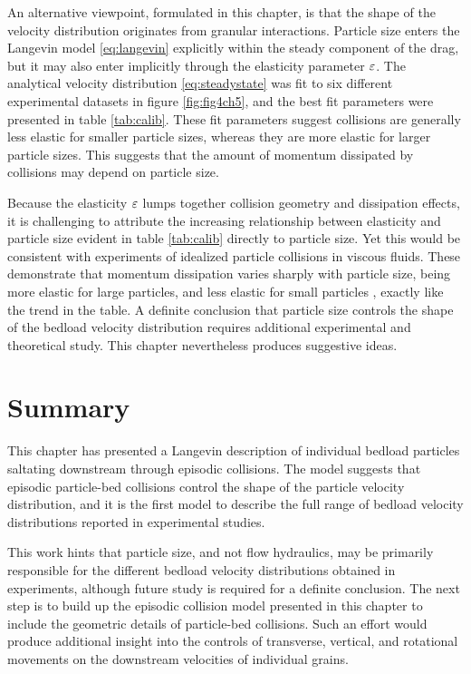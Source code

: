 An alternative viewpoint, formulated in this chapter, is that the shape of the velocity distribution originates from granular interactions.
Particle size enters the Langevin model \ref{eq:langevin} explicitly within the steady component of the drag, but it may also enter implicitly through the elasticity parameter $\varepsilon$.
The analytical velocity distribution \ref{eq:steadystate} was fit to six different experimental datasets in figure \ref{fig:fig4ch5}, and the best fit parameters were presented in table \ref{tab:calib}.
These fit parameters suggest collisions are generally less elastic for smaller particle sizes, whereas they are more elastic for larger particle sizes. This suggests that the amount of momentum dissipated by collisions may depend on particle size.

Because the elasticity $\varepsilon$ lumps together collision geometry and dissipation effects, it is challenging to attribute the increasing relationship between elasticity and particle size evident in table \ref{tab:calib} directly to particle size.
Yet this would be consistent with experiments of idealized particle collisions in viscous fluids. These demonstrate that momentum dissipation varies sharply with particle size, being more elastic for large particles, and less elastic for small particles \citep{Joseph2001,Yang2006,Schmeeckle2001}, exactly like the trend in the table.
A definite conclusion that particle size controls the shape of the bedload velocity distribution requires additional experimental and theoretical study. This chapter nevertheless produces suggestive ideas.

\section{Summary}
\label{sec:langconclusion}
This chapter has presented a Langevin description of individual bedload particles saltating downstream through episodic collisions.
The model suggests that episodic particle-bed collisions control the shape of the particle velocity distribution, and it is the first model to describe the full range of bedload velocity distributions reported in experimental studies.

This work hints that particle size, and not flow hydraulics, may be primarily responsible for the different bedload velocity distributions obtained in experiments, although future study is required for a definite conclusion.
The next step is to build up the episodic collision model presented in this chapter to include the geometric details of particle-bed collisions.
Such an effort would produce additional insight into the controls of transverse, vertical, and rotational movements on the downstream velocities of individual grains.

